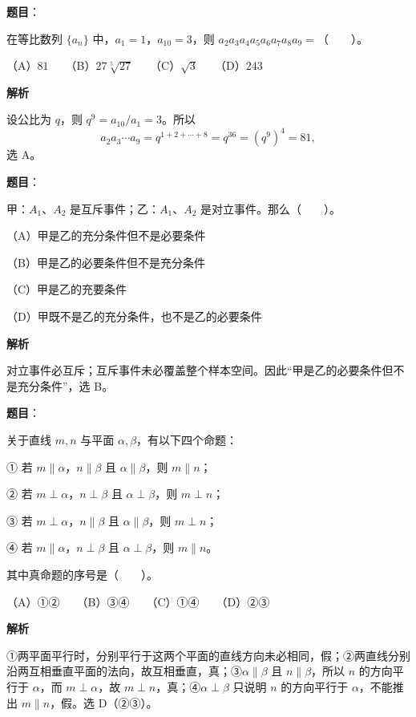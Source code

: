 \begin{answer}

\textbf{题目}：

在等比数列 $\{a_n\}$ 中，$a_1=1$，$a_{10}=3$，则 $a_2a_3a_4a_5a_6a_7a_8a_9=$\mbox{（　　）}。

（A）$81$　　（B）$27\sqrt[5]{27}$　　（C）$\sqrt3$　　（D）$243$

\textbf{解析}

设公比为 $q$，则 $q^9=a_{10}/a_1=3$。所以
\nopagebreak[4]
\[
a_2a_3\cdots a_9=q^{1+2+\cdots+8}=q^{36}=(q^9)^4=81,
\]
选 A。


\end{answer}
\begin{answer}

\textbf{题目}：

甲：$A_1\text{、}A_2$ 是互斥事件；乙：$A_1\text{、}A_2$ 是对立事件。那么\mbox{（　　）}。

（A）甲是乙的充分条件但不是必要条件

（B）甲是乙的必要条件但不是充分条件

（C）甲是乙的充要条件

（D）甲既不是乙的充分条件，也不是乙的必要条件

\textbf{解析}

对立事件必互斥；互斥事件未必覆盖整个样本空间。因此“甲是乙的必要条件但不是充分条件”，选 B。


\end{answer}
\begin{answer}

\textbf{题目}：

关于直线 $m,n$ 与平面 $\alpha,\beta$，有以下四个命题：

① 若 $m\parallel\alpha$，$n\parallel\beta$ 且 $\alpha\parallel\beta$，则 $m\parallel n$；

② 若 $m\perp\alpha$，$n\perp\beta$ 且 $\alpha\perp\beta$，则 $m\perp n$；

③ 若 $m\perp\alpha$，$n\parallel\beta$ 且 $\alpha\parallel\beta$，则 $m\perp n$；

④ 若 $m\parallel\alpha$，$n\perp\beta$ 且 $\alpha\perp\beta$，则 $m\parallel n$。

其中真命题的序号是\mbox{（　　）}。

（A）①②　　（B）③④　　（C）①④　　（D）②③

\textbf{解析}

①两平面平行时，分别平行于这两个平面的直线方向未必相同，假；②两直线分别沿两互相垂直平面的法向，故互相垂直，真；③$\alpha\parallel\beta$ 且 $n\parallel\beta$，所以 $n$ 的方向平行于 $\alpha$，而 $m\perp\alpha$，故 $m\perp n$，真；④$\alpha\perp\beta$ 只说明 $n$ 的方向平行于 $\alpha$，不能推出 $m\parallel n$，假。选 D（②③）。


\end{answer}
